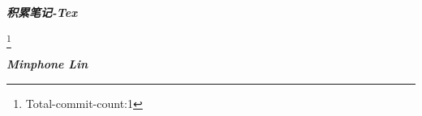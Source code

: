 
\begin{titlepage}
    \vspace*{\fill}
    \begin{center}
        {\Huge\textsl{\textbf{积累笔记-Tex}}}

        \bigskip
        {}\footnote{Total-commit-count:1} %

        \bigskip
        {\small\textsl{\textbf{Minphone Lin}}}

    \end{center}
\end{titlepage}


